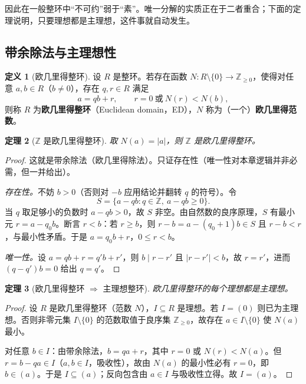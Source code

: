 \documentclass[a4paper,11pt]{ctexart}
\numberwithin{equation}{section}
\theoremstyle{plain}
\newtheorem{theorem}{定理}[section]
\theoremstyle{definition}
\newtheorem{definition}[theorem]{定义}
\theoremstyle{remark}
\newcommand{\Z}{\mathbb{Z}}
\begin{document}
因此在一般整环中“不可约”弱于“素”。唯一分解的实质正在于二者重合；下面的定理说明，只要理想都是主理想，这件事就自动发生。

\subsection{带余除法与主理想性}

\begin{definition}[欧几里得整环]\label{def:ED}
设 $R$ 是整环。若存在函数 $N\colon R\setminus\{0\}\to\Z_{\ge 0}$，使得对任意 $a,b\in R$（$b\neq 0$），存在 $q,r\in R$ 满足
\[
a=qb+r,\qquad r=0 \ \text{或}\ N(r)<N(b),
\]
则称 $R$ 为\textbf{欧几里得整环}（Euclidean domain，ED），$N$ 称为（一个）\textbf{欧几里得范数}。
\end{definition}

\begin{theorem}[$\Z$ 是欧几里得整环]\label{thm:Zed}
取 $N(a)=|a|$，则 $\Z$ 是欧几里得整环。
\end{theorem}

\begin{proof}
这就是带余除法（欧几里得除法）。只证存在性（唯一性对本章逻辑并非必需，但一并给出）。

\emph{存在性。}不妨 $b>0$（否则对 $-b$ 应用结论并翻转 $q$ 的符号）。令
\[
S=\{a-qb : q\in\Z,\ a-qb\ge 0\}.
\]
当 $q$ 取足够小的负数时 $a-qb>0$，故 $S$ 非空。由自然数的良序原理，$S$ 有最小元 $r=a-q_0b$。断言 $r<b$：若 $r\ge b$，则 $r-b=a-(q_0+1)b\in S$ 且 $r-b<r$，与最小性矛盾。于是 $a=q_0b+r$，$0\le r<b$。

\emph{唯一性。}设 $a=qb+r=q'b+r'$，则 $b\mid r-r'$ 且 $|r-r'|<b$，故 $r=r'$，进而 $(q-q')b=0$ 给出 $q=q'$。
\end{proof}

\begin{theorem}[欧几里得整环 $\Rightarrow$ 主理想整环]\label{thm:EDPID}
欧几里得整环的每个理想都是主理想。
\end{theorem}

\begin{proof}
设 $R$ 是欧几里得整环（范数 $N$），$I\subseteq R$ 是理想。若 $I=(0)$ 则已为主理想。否则非零元集 $I\setminus\{0\}$ 的范数取值于良序集 $\Z_{\ge0}$，故存在 $a\in I\setminus\{0\}$ 使 $N(a)$ 最小。

对任意 $b\in I$：由带余除法，$b=qa+r$，其中 $r=0$ 或 $N(r)<N(a)$。但 $r=b-qa\in I$（$a,b\in I$，吸收性），故由 $N(a)$ 的最小性必有 $r=0$，即 $b\in(a)$。于是 $I\subseteq(a)$；反向包含由 $a\in I$ 与吸收性立得。故 $I=(a)$。
\end{proof}
\end{document}
